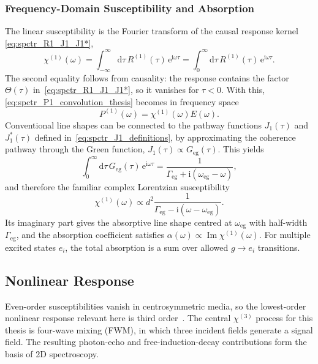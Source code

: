 \subsubsection{Frequency-Domain Susceptibility and Absorption}
\label{spctr:sec:freq_domain_1d_response}
The linear susceptibility is the Fourier transform of the causal response kernel \autoref{eq:spctr_R1_J1_J1*},
\begin{equation*}
	\chi^{(1)}(\omega)
	= \int_{-\infty}^{\infty}\!\mathrm{d}\tau\,R^{(1)}(\tau)\,
	\mathrm{e}^{\mathrm{i}\omega\tau}
	= \int_0^{\infty}\!\mathrm{d}\tau\,R^{(1)}(\tau)\,
	\mathrm{e}^{\mathrm{i}\omega\tau}.
\end{equation*}
The second equality follows from causality: the response contains the factor $\Theta(\tau)$ in~\autoref{eq:spctr_R1_J1_J1*}, so it vanishes for $\tau<0$.
With this, \autoref{eq:spctr_P1_convolution_thesis} becomes in frequency space
\begin{equation*}
		P^{(1)}(\omega) = \chi^{(1)}(\omega)E(\omega).
\end{equation*}
Conventional line shapes can be connected to the pathway functions $J_1(\tau)$ and $J_1^*(\tau)$ defined in~\autoref{eq:spctr_J1_definitions}, by approximating the coherence pathway through the Green function, $J_1(\tau)\propto G_{\mathrm{eg}}(\tau)$.
This yields
\begin{equation*}
	\int_0^{\infty}\!\mathrm{d}\tau\,
	G_{\mathrm{eg}}(\tau)\,\mathrm{e}^{\mathrm{i}\omega\tau}
	= \frac{1}{\Gamma_{\mathrm{eg}}+\mathrm{i}(\omega_{\mathrm{eg}}-\omega)},
\end{equation*}
and therefore the familiar complex Lorentzian susceptibility
\begin{equation*}
	\chi^{(1)}(\omega)
	\propto d^2
	\frac{1}{\Gamma_{\mathrm{eg}} - \mathrm{i}(\omega-\omega_{\mathrm{eg}})}.
\end{equation*}
Its imaginary part gives the absorptive line shape centred at $\omega_{\mathrm{eg}}$ with half-width $\Gamma_{\mathrm{eg}}$, and the absorption coefficient satisfies $\alpha(\omega)\propto \operatorname{Im}\chi^{(1)}(\omega)$.
For multiple excited states $e_i$, the total absorption is a sum over allowed $g\to e_i$ transitions.

\subsection{Nonlinear Response}
\label{sec:spctr_third_order_response}
Even-order susceptibilities vanish in centrosymmetric media, so the lowest-order nonlinear response relevant here is third order~\cite{mukamel1995principlesnonlinearoptical,mancal2022nonlinearopticalspectroscopy}.
The central $\chi^{(3)}$ process for this thesis is four-wave mixing (FWM), in which three incident fields generate a signal field.
The resulting photon-echo and free-induction-decay contributions form the basis of 2D spectroscopy.

